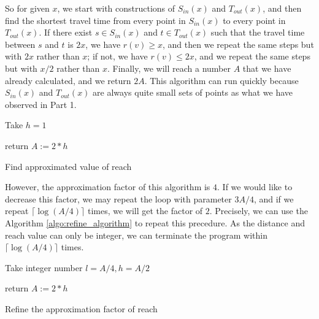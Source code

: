 \documentclass[titlepage,11pt,a4paper]{article}
\begin{document}
So for given $x$, we start with constructions of $S_{in}(x)$ and $T_{out}(x)$, and then find the shortest travel time from every point in $S_{in}(x)$ to every point in $T_{out}(x)$. If there exist $s\in S_{in}(x)$ and $t\in T_{out}(x)$ such that the travel time between $s$ and $t$ is $2x$, we have $r(v)\geq x$, and then we repeat the same steps but with $2x$ rather than $x$; if not, we have $r(v)\leq 2x$, and we repeat the same steps but with $x/2$ rather than $x$. Finally, we will reach a number $A$ that we have already calculated, and we return $2A$. This algorithm can run quickly because $S_{in}(x)$ and $T_{out}(x)$ are always quite small sets of points as what we have observed in Part 1.


\begin{algorithm}[H]
 \KwResult{a value A such that $r(v)$ is in the range $[A/4, A)$.}
 Take $h=1$\;


return $A := 2*h$\;

\caption{Find approximated value of reach}
\end{algorithm}

However, the approximation factor of this algorithm is $4$. If we would like to decrease this factor, we may repeat the loop with parameter $3A/4$, and if we repeat $\lceil\log(A/4)\rceil$ times, we will get the factor of $2$. Precisely, we can use the Algorithm \ref{algo:refine_algorithm} to repeat this precedure. As the distance and reach value can only be integer, we can terminate the program within $\lceil\log(A/4)\rceil$ times.\\

\begin{algorithm}[H]
 \KwData{value $A$ such that $r(v)$ is in the range $[A/4, A)$.}
 \KwResult{value $A^*$ such that $r(v)$ is in the range $[A^*/2, A^*)$.}
 Take integer number $l=A/4, h=A/2$\;

return $A := 2*h$\;

\caption{Refine the approximation factor of reach}
\label{algo:refine_algorithm}
\end{algorithm}
\end{document}
